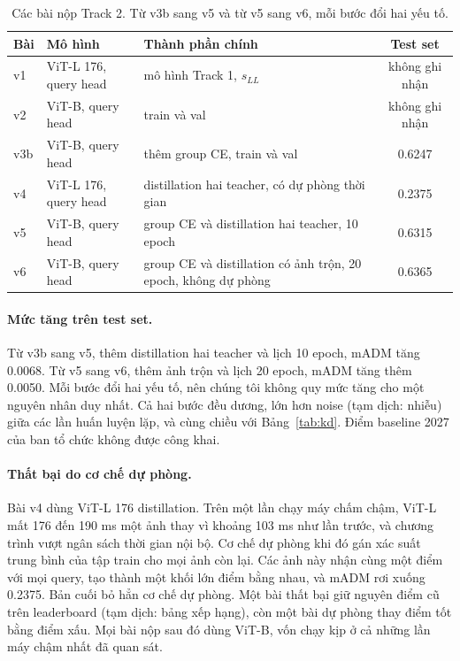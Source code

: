 \documentclass[11pt,a4paper]{article}
\begin{document}
\begin{table}[H]
\centering\small
\begin{tabularx}{\linewidth}{@{}llXc@{}}
\toprule
Bài & Mô hình & Thành phần chính & Test set \\
\midrule
v1 & ViT-L 176, query head & mô hình Track 1, $s_{LL}$ & không ghi nhận \\
v2 & ViT-B, query head & train và val & không ghi nhận \\
v3b & ViT-B, query head & thêm group CE, train và val & 0.6247 \\
v4 & ViT-L 176, query head & distillation hai teacher, có dự phòng thời gian & 0.2375 \\
v5 & ViT-B, query head & group CE và distillation hai teacher, 10 epoch & 0.6315 \\
v6 & ViT-B, query head & group CE và distillation có ảnh trộn, 20 epoch, không dự phòng & 0.6365 \\
\bottomrule
\end{tabularx}
\caption{Các bài nộp Track 2. Từ v3b sang v5 và từ v5 sang v6, mỗi bước đổi hai yếu tố.}
\label{tab:lb}
\end{table}

\paragraph{Mức tăng trên test set.} Từ v3b sang v5, thêm distillation hai teacher và lịch 10 epoch, mADM tăng 0.0068. Từ v5 sang v6, thêm ảnh trộn và lịch 20 epoch, mADM tăng thêm 0.0050. Mỗi bước đổi hai yếu tố, nên chúng tôi không quy mức tăng cho một nguyên nhân duy nhất. Cả hai bước đều dương, lớn hơn noise (tạm dịch: nhiễu) giữa các lần huấn luyện lặp, và cùng chiều với Bảng~\ref{tab:kd}. Điểm baseline 2027 của ban tổ chức không được công khai.

\paragraph{Thất bại do cơ chế dự phòng.} Bài v4 dùng ViT-L 176 distillation. Trên một lần chạy máy chấm chậm, ViT-L mất 176 đến 190 ms một ảnh thay vì khoảng 103 ms như lần trước, và chương trình vượt ngân sách thời gian nội bộ. Cơ chế dự phòng khi đó gán xác suất trung bình của tập train cho mọi ảnh còn lại. Các ảnh này nhận cùng một điểm với mọi query, tạo thành một khối lớn điểm bằng nhau, và mADM rơi xuống 0.2375. Bản cuối bỏ hẳn cơ chế dự phòng. Một bài thất bại giữ nguyên điểm cũ trên leaderboard (tạm dịch: bảng xếp hạng), còn một bài dự phòng thay điểm tốt bằng điểm xấu. Mọi bài nộp sau đó dùng ViT-B, vốn chạy kịp ở cả những lần máy chậm nhất đã quan sát.
\end{document}
